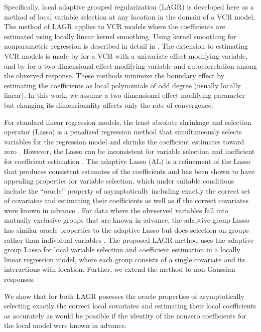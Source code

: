 \documentclass[authoryear,review, 12pt]{elsarticle}
\begin{document}
Specifically, local adaptive grouped regularization (LAGR) is developed
here as a method of local variable selection at any location in the
domain of a VCR model. The method of LAGR applies to VCR models where
the coefficients are estimated using locally linear kernel smoothing.
Using kernel smoothing for nonparametric regression is described in
detail in \citet*{Fan-Gijbels-1996}. The extension to estimating
VCR models is made by \citet{Fan-Zhang-1999} for a VCR with a univariate
effect-modifying variable, and by \citet{Sun-Yan-Zhang-Lu-2014} for
a two-dimensional effect-modifying variable and autocorrelation among
the obverved response. These methods minimize the boundary effect
\citep{Hastie:1993b} by estimating the coefficients as local polynomials
of odd degree (usually locally linear). In this work, we assume a
two dimensional effect modifying parameter but changing its dimensionality
affects only the rate of convergence.

For standard linear regression models, the least absolute shrinkage
and selection operator (Lasso) is a penalized regression method that
simultaneously selects variables for the regression model and shrinks
the coefficient estimates toward zero \citep{Tibshirani-1996}. However,
the Lasso can be inconsistent for variable selection and inefficient
for coefficient estimation \citep{Zou-2006}. The adaptive Lasso (AL)
is a refinement of the Lasso that produces consistent estimates of
the coefficients and has been shown to have appealing properties for
variable selection, which under suitable conditions include the ``oracle''
property of asymptotically including exactly the correct set of covariates
and estimating their coefficients as well as if the correct covariates
were known in advance \citep{Zou-2006}. For data where the obvserved
variables fall into mutually exclusive groups that are known in advance,
the adaptive group Lasso has similar oracle properties to the adaptive
Lasso but does selection on groups rather than individual variables
\citep{Yuan-Lin-2006,Wang-Leng-2008}. The proposed LAGR method uses
the adaptive group Lasso for local variable selection and coefficient
estimation in a locally linear regression model, where each group
consists of a single covariate and its interactions with location.
Further, we extend the method to non-Gaussian responses.

We show that for both LAGR posesses the oracle properties of asymptotically
selecting exactly the correct local covariates and estimating their
local coefficients as accurately as would be possible if the identity
of the nonzero coefficients for the local model were known in advance.
\end{document}
